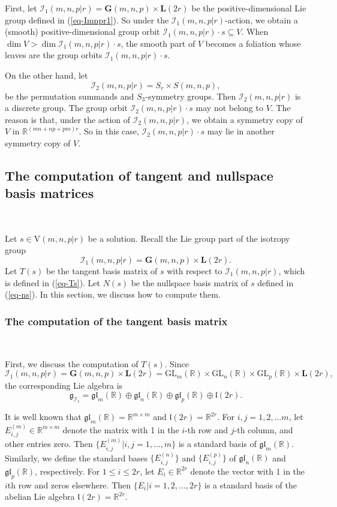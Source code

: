 \documentclass[reqno]{amsart}
\theoremstyle{definition}
\numberwithin{equation}{section}
\theoremstyle{remark}
\begin{document}
First, let $\mathcal{I}_1(m,n,p|r)=\mathbf{G}(m,n,p)\times \mathbf{L}(2r)$
be the positive-dimensional Lie group defined in (\ref{eq-Imnpr1}). So  under the $\mathcal{I}_1(m,n,p|r)$-action, we obtain a (smooth) positive-dimensional group orbit $\mathcal{I}_1(m,n,p|r)\cdot s\subseteq V$. 
When $\dim V> \dim \mathcal{I}_1(m,n,p|r)\cdot s$, the smooth part of $V$ becomes a foliation whose leaves are the group orbits $\mathcal{I}_1(m,n,p|r)\cdot s$.

On the other hand, let
\begin{equation}\label{eq-I2}
\mathcal{I}_2(m,n,p|r)=S_r\times S(m,n,p),
\end{equation}
be the permutation summands and $S_3$-symmetry groups. Then $\mathcal{I}_2(m,n,p|r)$ is a discrete group. The group orbit $\mathcal{I}_2(m,n,p|r)\cdot s$ may not belong to $V$. The reason is that, under the action of $\mathcal{I}_2(m,n,p|r)$, we obtain a  symmetry copy of $V$ in $\mathbb{R}^{(mn+np+pm)r}$. So in this case, $\mathcal{I}_2(m,n,p|r)\cdot s$ may lie in another symmetry copy of $V$.

\subsection{The computation of tangent and nullspace basis matrices}
\

Let $s\in \mathrm{V}(m,n,p|r)$ be a solution. Recall the Lie group part of the isotropy group $$\mathcal{I}_1(m,n,p|r)=\mathbf{G}(m,n,p)\times\mathbf{L}(2r).$$ 
Let $T(s)$ be the tangent basis matrix of $s$ with respect to $\mathcal{I}_1(m,n,p|r)$, which is defined in (\ref{eq-Ts}). Let $N(s)$ be the nullspace basis matrix of $s$ defined in (\ref{eq-ns}).
In this section, we discuss how to compute them. 

\subsubsection{The computation of the tangent basis matrix}
\

First, we discuss the computation of $T(s)$. Since
$$\mathcal{I}_1(m,n,p|r)=\mathbf{G}(m,n,p)\times\mathbf{L}(2r)=\mathrm{GL}_m(\mathbb{R})\times \mathrm{GL}_n(\mathbb{R}) \times \mathrm{GL}_p(\mathbb{R})\times \mathbf{L}(2r),$$
the corresponding Lie algebra is
$$\mathfrak{g}_{\mathcal{I}_1}=\mathfrak{gl}_m(\mathbb{R})\oplus \mathfrak{gl}_n(\mathbb{R}) \oplus \mathfrak{gl}_p(\mathbb{R})\oplus \mathfrak{l}(2r).$$

It is well known that
$\mathfrak{gl}_m (\mathbb{R})=\mathbb{R}^{m\times m}$ and $\mathfrak{l}(2r)=\mathbb{R}^{2r}$.
For $i,j=1,2,\ldots m$, let $E_{i,j}^{(m)}\in \mathbb{R}^{m\times m}$ denote the matrix with 1 in the $i$-th row and $j$-th column, and other entries zero.  Then $\{E_{i,j}^{(m)}|i,j=1,...,m\}$ is a standard basis of $\mathfrak{gl}_m(\mathbb{R})$. Similarly, we define the standard bases 
$\{E_{i,j}^{(n)} \}$ and $\{E_{i,j}^{(p)} \}$ of  
$\mathfrak{gl}_n(\mathbb{R})$ and $\mathfrak{gl}_p(\mathbb{R})$, respectively.
For $1\leq i\leq 2r$, let $E_{i}\in \mathbb{R}^{2r}$ denote the vector with 1 in the $i$th row and zeros elsewhere. Then $\{E_i|i=1,2,\ldots,2r\}$ is a standard basis of the abelian Lie algebra $\mathfrak{l}(2r)=\mathbb{R}^{2r}$.
\end{document}
